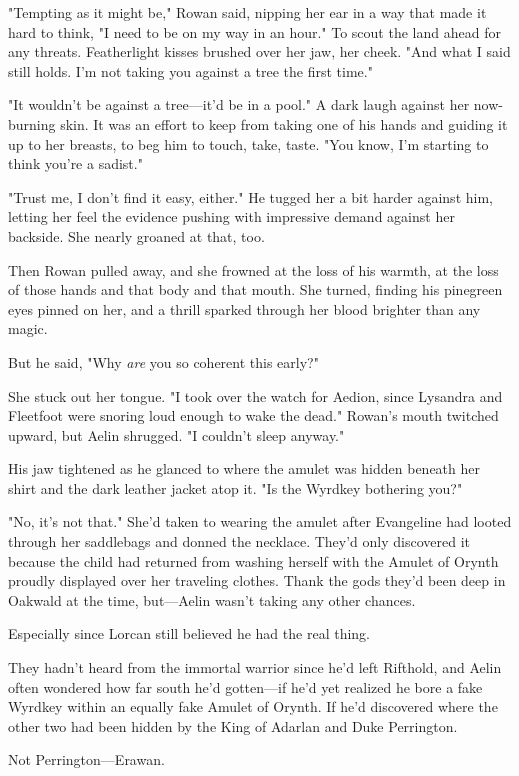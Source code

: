 "Tempting as it might be," Rowan said, nipping her ear in a way that made it hard to think, "I need to be on my way in an hour."
To scout the land ahead for any threats.
Featherlight kisses brushed over her jaw, her cheek.
"And what I said still holds.
I'm not taking you against a tree the first time."

"It wouldn't be against a tree---it'd be in a pool."
A dark laugh against her now-burning skin.
It was an effort to keep from taking one of his hands and guiding it up to her breasts, to beg him to touch, take, taste.
"You know, I'm starting to think you're a sadist."

"Trust me, I don't find it easy, either."
He tugged her a bit harder against him, letting her feel the evidence pushing with impressive demand against her backside.
She nearly groaned at that, too.

Then Rowan pulled away, and she frowned at the loss of his warmth, at the loss of those hands and that body and that mouth.
She turned, finding his pinegreen eyes pinned on her, and a thrill sparked through her blood brighter than any magic.

But he said, "Why \emph{are} you so coherent this early?"

She stuck out her tongue.
"I took over the watch for Aedion, since Lysandra and Fleetfoot were snoring loud enough to wake the dead."
Rowan's mouth twitched upward, but Aelin shrugged.
"I couldn't sleep anyway."

His jaw tightened as he glanced to where the amulet was hidden beneath her shirt and the dark leather jacket atop it.
"Is the Wyrdkey bothering you?"

"No, it's not that."
She'd taken to wearing the amulet after Evangeline had looted through her saddlebags and donned the necklace.
They'd only discovered it because the child had returned from washing herself with the Amulet of Orynth proudly displayed over her traveling clothes.
Thank the gods they'd been deep in Oakwald at the time, but---Aelin wasn't taking any other chances.

Especially since Lorcan still believed he had the real thing.

They hadn't heard from the immortal warrior since he'd left Rifthold, and Aelin often wondered how far south he'd gotten---if he'd yet realized he bore a fake Wyrdkey within an equally fake Amulet of Orynth.
If he'd discovered where the other two had been hidden by the King of Adarlan and Duke Perrington.

Not Perrington---Erawan.

